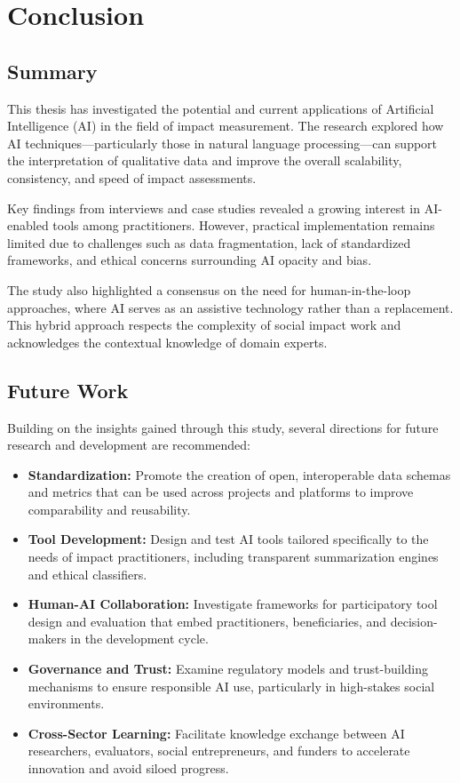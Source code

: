 
\chapter{Conclusion}

\section{Summary}

This thesis has investigated the potential and current applications of Artificial Intelligence (AI) in the field of impact measurement. The research explored how AI techniques—particularly those in natural language processing—can support the interpretation of qualitative data and improve the overall scalability, consistency, and speed of impact assessments.

Key findings from interviews and case studies revealed a growing interest in AI-enabled tools among practitioners. However, practical implementation remains limited due to challenges such as data fragmentation, lack of standardized frameworks, and ethical concerns surrounding AI opacity and bias.

The study also highlighted a consensus on the need for human-in-the-loop approaches, where AI serves as an assistive technology rather than a replacement. This hybrid approach respects the complexity of social impact work and acknowledges the contextual knowledge of domain experts.

\section{Future Work}

Building on the insights gained through this study, several directions for future research and development are recommended:

\begin{itemize}
    \item \textbf{Standardization:} Promote the creation of open, interoperable data schemas and metrics that can be used across projects and platforms to improve comparability and reusability.
    \item \textbf{Tool Development:} Design and test AI tools tailored specifically to the needs of impact practitioners, including transparent summarization engines and ethical classifiers.
    \item \textbf{Human-AI Collaboration:} Investigate frameworks for participatory tool design and evaluation that embed practitioners, beneficiaries, and decision-makers in the development cycle.
    \item \textbf{Governance and Trust:} Examine regulatory models and trust-building mechanisms to ensure responsible AI use, particularly in high-stakes social environments.
    \item \textbf{Cross-Sector Learning:} Facilitate knowledge exchange between AI researchers, evaluators, social entrepreneurs, and funders to accelerate innovation and avoid siloed progress.
\end{itemize}

